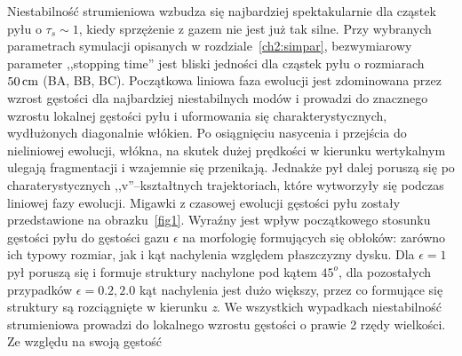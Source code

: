 Niestabilność strumieniowa wzbudza się najbardziej spektakularnie dla cząstek
pyłu o $\tau_s \sim 1$, kiedy sprzężenie z gazem nie jest już tak silne. Przy
wybranych parametrach symulacji opisanych w rozdziale~\ref{ch2:simpar},
bezwymiarowy parameter ,,stopping time'' jest bliski jedności dla cząstek pyłu o
rozmiarach $50\hbox{$\thinspace\textrm{cm}$}$ (BA, BB, BC). Początkowa liniowa faza ewolucji jest
zdominowana przez wzrost gęstości dla najbardziej niestabilnych modów i prowadzi
do znacznego wzrostu lokalnej gęstości pyłu i uformowania się
charakterystycznych, wydłużonych diagonalnie włókien. Po osiągnięciu nasycenia i
przejścia do nieliniowej ewolucji, włókna, na skutek dużej prędkości w kierunku
wertykalnym ulegają fragmentacji i wzajemnie się przenikają. Jednakże pył dalej
poruszą się po charaterystycznych ,,v''--kształtnych trajektoriach, które
wytworzyły się podczas liniowej fazy ewolucji. Migawki z czasowej ewolucji
gęstości pyłu zostały przedstawione na obrazku~\ref{fig1}. Wyraźny jest wpływ
początkowego stosunku gęstości pyłu do gęstości gazu $\epsilon$ na morfologię
formujących się obłoków: zarówno ich typowy rozmiar, jak i kąt nachylenia
względem płaszczyzny dysku. Dla $\epsilon = 1$ pył poruszą się i formuje
struktury nachylone pod kątem $45^o$, dla pozostałych przypadków $\epsilon=0.2,
2.0$ kąt nachylenia jest dużo większy, przez co formujące się struktury są
rozciągnięte w kierunku \emph{z}. We wszystkich wypadkach niestabilność
strumieniowa prowadzi do lokalnego wzrostu gęstości o prawie 2 rzędy wielkości.
Ze względu na swoją gęstość

